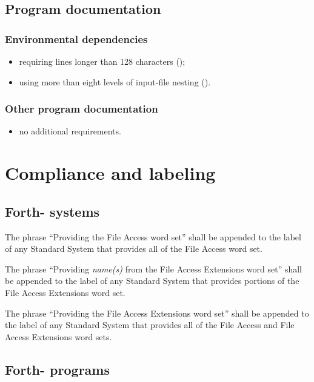 \subsection{Program documentation} %

\subsubsection{Environmental dependencies} %
\begin{itemize}
\item requiring lines longer than 128 characters
	();
\item using more than eight levels of input-file nesting
	().
\end{itemize}

\subsubsection{Other program documentation} %
\begin{itemize}
\item no additional requirements.
\end{itemize}

\section{Compliance and labeling} %

\subsection{Forth-\snapshot{} systems} %

The phrase ``Providing the File Access word set'' shall be appended
to the label of any Standard System that provides all of the File
Access word set.

The phrase ``Providing \emph{name(s)} from the File Access Extensions
word set'' shall be appended to the label of any Standard System that
provides portions of the File Access Extensions word set.

The phrase ``Providing the File Access Extensions word set'' shall
be appended to the label of any Standard System that provides all of
the File Access and File Access Extensions word sets.

\subsection{Forth-\snapshot{} programs} %

